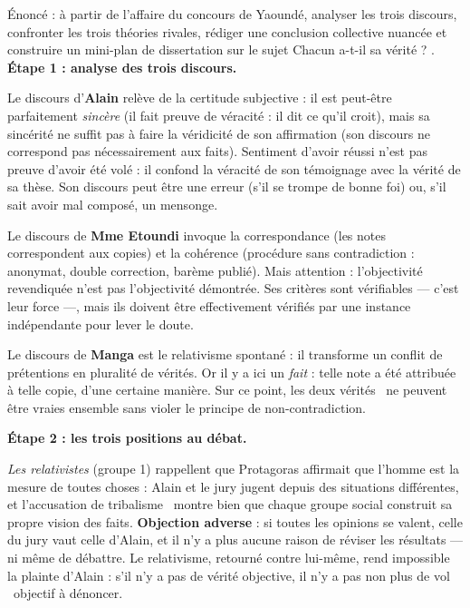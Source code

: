 \documentclass[11pt]{article}
\newcommand{\cle}[1]{{\popxbold\color{popdark}#1}}
\begin{document}
\begin{exoresolu}
Énoncé : à partir de l'affaire du concours de Yaoundé, analyser les trois discours, confronter les trois théories rivales, rédiger une conclusion collective nuancée et construire un mini-plan de dissertation sur le sujet \guillemotleft Chacun a-t-il sa vérité ? \guillemotright.
\tcblower
\textbf{Étape 1 : analyse des trois discours.}

Le discours d'\textbf{Alain} relève de la \cle{certitude subjective} : il est peut-être parfaitement \emph{sincère} (il fait preuve de \cle{véracité} : il dit ce qu'il croit), mais sa sincérité ne suffit pas à faire la \cle{véridicité} de son affirmation (son discours ne correspond pas nécessairement aux faits). Sentiment d'avoir réussi n'est pas preuve d'avoir été volé : il confond la véracité de son témoignage avec la vérité de sa thèse. Son discours peut être une \cle{erreur} (s'il se trompe de bonne foi) ou, s'il sait avoir mal composé, un \cle{mensonge}.

Le discours de \textbf{Mme Etoundi} invoque la \cle{correspondance} (les notes correspondent aux copies) et la \cle{cohérence} (procédure sans contradiction : anonymat, double correction, barème publié). Mais attention : l'objectivité revendiquée n'est pas l'objectivité démontrée. Ses critères sont vérifiables — c'est leur force —, mais ils doivent être effectivement vérifiés par une instance indépendante pour lever le doute.

Le discours de \textbf{Manga} est le relativisme spontané : il transforme un conflit de prétentions en pluralité de vérités. Or il y a ici un \emph{fait} : telle note a été attribuée à telle copie, d'une certaine manière. Sur ce point, les deux \guillemotleft vérités \guillemotright\ ne peuvent être vraies ensemble sans violer le principe de non-contradiction.

\textbf{Étape 2 : les trois positions au débat.}

\emph{Les relativistes} (groupe 1) rappellent que Protagoras affirmait que l'homme est la mesure de toutes choses : Alain et le jury jugent depuis des situations différentes, et l'accusation de \guillemotleft tribalisme \guillemotright\ montre bien que chaque groupe social construit sa propre vision des faits. \textbf{Objection adverse} : si toutes les opinions se valent, celle du jury vaut celle d'Alain, et il n'y a plus aucune raison de réviser les résultats — ni même de débattre. Le relativisme, retourné contre lui-même, rend impossible la plainte d'Alain : s'il n'y a pas de vérité objective, il n'y a pas non plus de \guillemotleft vol \guillemotright\ objectif à dénoncer.


\end{exoresolu}
\end{document}
